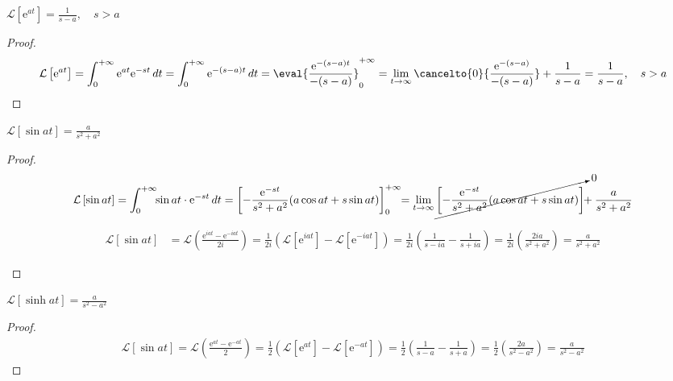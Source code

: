 \documentclass[a4paper,table]{report}
\begin{document}
\begin{mybox3}
\begin{example}
  $ {\mathcal{L}\left[\mathrm{e}^{at}\right] = \frac{1}{s-a}, \quad s > a} $ 
\end{example}
\end{mybox3}
\begin{proof}
  \[
    \mathcal{L}\left[\mathrm{e}^{at}\right] = \int_{0}^{+\infty} \mathrm{e}^{at} 
    \mathrm{e}^{-st} \,{dt} = \int_{0}^{+\infty} \mathrm{e}^{-(s-a)t} \,{dt} =
    \eval{\frac{\mathrm{e}^{-(s-a)t}}{-(s-a)}} _{0}^{+\infty} = 
    \lim_{t \to \infty} \cancelto{0}{\frac{\mathrm{e}^{-(s-a)}}{-(s-a)}}
    + \frac{1}{s-a} = \frac{1}{s-a}, \quad s > a
  \]
\end{proof}

\begin{mybox3}
\begin{example}
  $ \mathcal{L}\left[\sin{at}\right] = \frac{a}{s^{2}+a^{2}} $
\end{example}
\end{mybox3}
\begin{proof}
  \begin{align*}
    \mathcal{L}\left[\sin{at}\right] &= \int_{0}^{+\infty}\!\! \sin{at} \cdot
    \mathrm{e}^{-st} \,{dt} = {\left[- \frac{\mathrm{e}^{-st}}{s^{2}+a^{2}} 
    (a \cos{at} + s \sin{at})\right]} _{0}^{+\infty} \!\!= \lim_{t \to \infty} 
    \cancelto{0}{\left[- \frac{\mathrm{e}^{-st}}{s^{2}+a^{2}} (a \cos{at} + s
    \sin{at})\right]} \!\! + \frac{a}{s^{2}+a^{2}} \\
  \end{align*} 
  \begin{description}[leftmargin=!]
    \item [Β Τρόπος:]
      \begin{align*}
        \mathcal{L}\left[\sin{at}\right] &= \mathcal{L}\left(\frac{\mathrm{e}^{iat} -
        \mathrm{e}^{-iat}}{2i}\right) = \frac{1}{2i} 
        \left(\mathcal{L}[\mathrm{e}^{iat}] - \mathcal{L}[\mathrm{e}^{-iat}]\right) = 
        \frac{1}{2i} \left(\frac{1}{s-ia} - \frac{1}{s+ia}\right) = 
        \frac{1}{2i} \left(\frac{2ia}{s^{2}+a^{2}}\right) = \frac{a}{s^{2}+a^{2}}
      \end{align*}
  \end{description}
\end{proof}

\begin{mybox3}
\begin{example}
  $ \mathcal{L}\left[\sinh{at}\right] = \frac{a}{s^{2}-a^{2}} $
\end{example}
\end{mybox3}
\begin{proof}
  \begin{align*}
    \mathcal{L}\left[\sin{at}\right] = \mathcal{L}\left(\frac{\mathrm{e}^{at} -
    \mathrm{e}^{-at}}{2}\right) = \frac{1}{2} 
    \left(\mathcal{L}[\mathrm{e}^{at}] - \mathcal{L}[\mathrm{e}^{-at}]\right) = 
    \frac{1}{2} \left(\frac{1}{s-a} - \frac{1}{s+a}\right) = 
    \frac{1}{2} \left(\frac{2a}{s^{2}-a^{2}}\right) = \frac{a}{s^{2}-a^{2}}
  \end{align*}
\end{proof}
\end{document}
